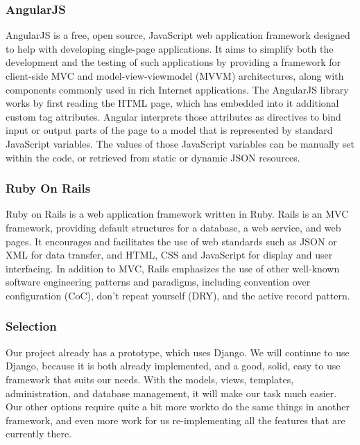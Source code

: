 \documentclass[draftclsnofoot,10pt,onecolumn]{IEEEtran} %
\begin{document}
\subsubsection{AngularJS}
AngularJS is a free, open source, JavaScript web application framework designed to help with developing single-page
applications. It aims to simplify both the development and the testing of such applications by providing a framework for
client-side MVC and model-view-viewmodel (MVVM) architectures, along with components commonly used in rich Internet
applications. The AngularJS library works by first reading the HTML page, which has embedded into it additional custom tag
attributes. Angular interprets those attributes as directives to bind input or output parts of the page to a model that is
represented by standard JavaScript variables. The values of those JavaScript variables can be manually set within the code, or
retrieved from static or dynamic JSON resources.\\

\subsubsection{Ruby On Rails}
Ruby on Rails is a web application framework written in Ruby. Rails is an MVC framework, providing default structures for
a database, a web service, and web pages. It encourages and facilitates the use of web standards such as JSON or XML for
data transfer, and HTML, CSS and JavaScript for display and user interfacing. In addition to MVC, Rails emphasizes the use
of other well-known software engineering patterns and paradigms, including convention over configuration (CoC), don't
repeat yourself (DRY), and the active record pattern. \\

\subsubsection{Selection}
Our project already has a prototype, which uses Django. We will continue to use Django, because it is both already
implemented, and a good, solid, easy to use framework that suits our needs. With the models, views, templates,
administration, and database management, it will make our task much easier. Our other options require quite a bit more workto do the same things in another framework, and even more work for us re-implementing all the features that are currently
there. \\
\end{document}
